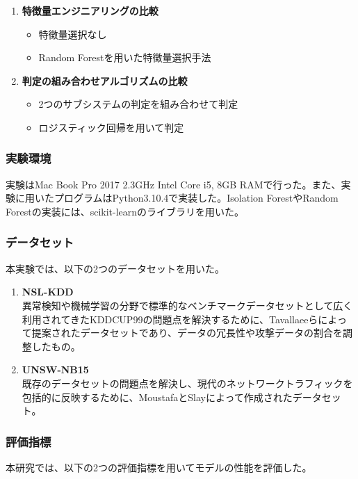 \documentclass{css}
\begin{document}
\begin{enumerate}
    \item \textbf{特徴量エンジニアリングの比較}
        \begin{itemize}
            \item 特徴量選択なし
            \item Random Forestを用いた特徴量選択手法
        \end{itemize}
    \item \textbf{判定の組み合わせアルゴリズムの比較}
        \begin{itemize}
            \item 2つのサブシステムの判定を組み合わせて判定
            \item ロジスティック回帰を用いて判定
        \end{itemize}
\end{enumerate}

\subsubsection{実験環境}

実験はMac Book Pro 2017 2.3GHz Intel Core i5, 8GB RAMで行った。また、実験に用いたプログラムはPython3.10.4で実装した。Isolation ForestやRandom Forestの実装には、scikit-learnのライブラリを用いた\cite{scikit-learn}。

\subsubsection{データセット}
本実験では、以下の2つのデータセットを用いた。

\begin{enumerate}
    \item \textbf{NSL-KDD}\\
        異常検知や機械学習の分野で標準的なベンチマークデータセットとして広く利用されてきたKDDCUP99\cite{KDDCUP99}の問題点を解決するために、Tavallaeeらによって提案されたデータセットであり、データの冗長性や攻撃データの割合を調整したもの\cite{Tavallaee2009-we}。
    \item \textbf{UNSW-NB15}\\
        既存のデータセットの問題点を解決し、現代のネットワークトラフィックを包括的に反映するために、MoustafaとSlayによって作成されたデータセット\cite{Moustafa2015-cg}。
\end{enumerate}


\subsubsection{評価指標}
本研究では、以下の2つの評価指標を用いてモデルの性能を評価した。
\end{document}
